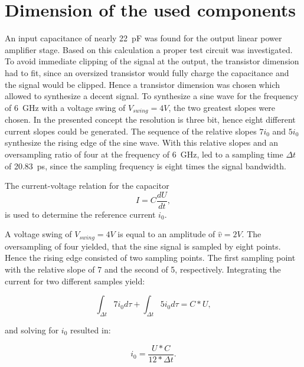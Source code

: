 \section{Dimension of the used components}
An input capacitance of nearly \SI{22}{\pico \farad} was found for the output linear power amplifier stage.
Based on this calculation a proper test circuit was investigated.
To avoid immediate clipping of the signal at the output, the transistor dimension had to fit, since an oversized transistor would fully charge the capacitance and the signal would be clipped.
Hence a transistor dimension was chosen which allowed to synthesize a decent signal.
To synthesize a sine wave for the frequency of \SI{6}{\giga \hertz} with a voltage swing of $V_{swing} = 4V$, the two greatest slopes were chosen.
In the presented concept the resolution is three bit, hence eight different current slopes could be generated.
The sequence of the relative slopes $7 i_0$ and $5 i_0$ synthesize the rising edge of the sine wave.
With this relative slopes and an oversampling ratio of four at the frequency of \SI{6}{\giga \hertz}, led to a sampling time $\Delta t$ of \SI{20.83}{\pico \second}, since the sampling frequency is eight times the signal bandwidth.

The current-voltage relation for the capacitor
\begin{equation}
	I = C \frac{d U}{d t},
\end{equation}
is used to determine the reference current $i_0$.

A voltage swing of $V_{swing} = 4V$ is equal to an amplitude of $\hat{v} = 2V$.
The oversampling of four yielded, that the sine signal is sampled by eight points.
Hence the rising edge consisted of two sampling points.
The first sampling point with the relative slope of 7 and the second of 5, respectively.
Integrating the current for two different samples yield:

\begin{equation}
\int_{\Delta t} 7 i_0 d\tau + \int_{\Delta t} 5 i_0 d \tau = C*U,
\end{equation}

and solving for $i_0$ resulted in:

\begin{equation}
i_0 = \frac{U*C}{12*\Delta t}.
\end{equation}

